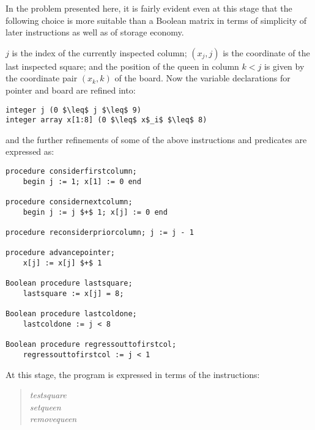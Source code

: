 In the problem presented here, it is fairly evident even at this stage that the
following choice is more suitable than a Boolean matrix in terms of simplicity
of later instructions as well as of storage economy.

$j$ is the index of the currently inspected column; $(x_j, j)$ is the
coordinate of the last inspected square; and the position of the queen in
column $k < j$ is given by the coordinate pair $(x_k, k)$ of the board.  Now
the variable declarations for pointer and board are refined into:

\begin{lstlisting}
integer j (0 $\leq$ j $\leq$ 9)
integer array x[1:8] (0 $\leq$ x$_i$ $\leq$ 8)
\end{lstlisting}

and the further refinements of some of the above instructions and predicates
are expressed as:

\begin{lstlisting}
procedure considerfirstcolumn;
    begin j := 1; x[1] := 0 end

procedure considernextcolumn;
    begin j := j $+$ 1; x[j] := 0 end

procedure reconsiderpriorcolumn; j := j - 1

procedure advancepointer;
    x[j] := x[j] $+$ 1

Boolean procedure lastsquare;
    lastsquare := x[j] = 8;

Boolean procedure lastcoldone;
    lastcoldone := j < 8

Boolean procedure regressouttofirstcol;
    regressouttofirstcol := j < 1
\end{lstlisting}

At this stage, the program is expressed in terms of the instructions:

\begin{quote}
\emph{testsquare}\\
\emph{setqueen}\\
\emph{removequeen}\\
\end{quote}

